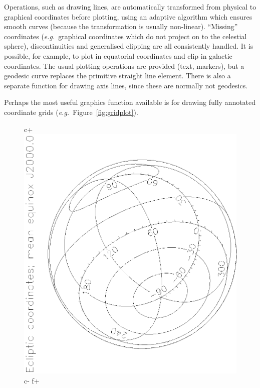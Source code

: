 \documentclass[twoside,11pt]{article}
\newenvironment{latexonly}{}{}
\begin{document}
Operations, such as drawing lines, are automatically transformed from
physical to graphical coordinates before plotting, using an adaptive
algorithm which ensures smooth curves (because the transformation is
usually non-linear).  ``Missing'' coordinates ({\em{e.g.}}\ graphical
coordinates which do not project on to the celestial sphere),
discontinuities and generalised clipping are all consistently handled.
It is possible, for example, to plot in equatorial coordinates and
clip in galactic coordinates.  The usual plotting operations are
provided (text, markers), but a geodesic curve replaces the primitive
straight line element.  There is also a separate function for drawing
axis lines, since these are normally not geodesics.

\begin{latexonly}
   Perhaps the most useful graphics function available is for drawing
   fully annotated coordinate grids ({\em{e.g.}}\ Figure~\ref{fig:gridplot}).
   \begin{figure}
   \begin{center}
c+
   \includegraphics[scale=0.8,angle=-90]{sun211_figures/gridplot_bw.eps}
c-
f+

\end{center}
\end{figure}
\end{latexonly}
\end{document}
